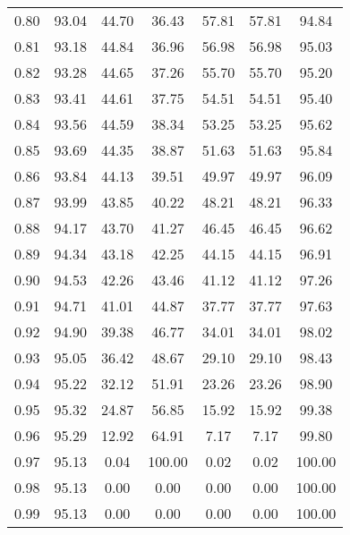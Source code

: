 \begin{tabular}{|c|c|c|c|c|c|c|}
      0.80 &     93.04 &     44.70 &      36.43 &   57.81 &      57.81 &         94.84 \\
      0.81 &     93.18 &     44.84 &      36.96 &   56.98 &      56.98 &         95.03 \\
      0.82 &     93.28 &     44.65 &      37.26 &   55.70 &      55.70 &         95.20 \\
      0.83 &     93.41 &     44.61 &      37.75 &   54.51 &      54.51 &         95.40 \\
      0.84 &     93.56 &     44.59 &      38.34 &   53.25 &      53.25 &         95.62 \\
      0.85 &     93.69 &     44.35 &      38.87 &   51.63 &      51.63 &         95.84 \\
      0.86 &     93.84 &     44.13 &      39.51 &   49.97 &      49.97 &         96.09 \\
      0.87 &     93.99 &     43.85 &      40.22 &   48.21 &      48.21 &         96.33 \\
      0.88 &     94.17 &     43.70 &      41.27 &   46.45 &      46.45 &         96.62 \\
      0.89 &     94.34 &     43.18 &      42.25 &   44.15 &      44.15 &         96.91 \\
      0.90 &     94.53 &     42.26 &      43.46 &   41.12 &      41.12 &         97.26 \\
      0.91 &     94.71 &     41.01 &      44.87 &   37.77 &      37.77 &         97.63 \\
      0.92 &     94.90 &     39.38 &      46.77 &   34.01 &      34.01 &         98.02 \\
      0.93 &     95.05 &     36.42 &      48.67 &   29.10 &      29.10 &         98.43 \\
      0.94 &     95.22 &     32.12 &      51.91 &   23.26 &      23.26 &         98.90 \\
      0.95 &     95.32 &     24.87 &      56.85 &   15.92 &      15.92 &         99.38 \\
      0.96 &     95.29 &     12.92 &      64.91 &    7.17 &       7.17 &         99.80 \\
      0.97 &     95.13 &      0.04 &     100.00 &    0.02 &       0.02 &        100.00 \\
      0.98 &     95.13 &      0.00 &       0.00 &    0.00 &       0.00 &        100.00 \\
      0.99 &     95.13 &      0.00 &       0.00 &    0.00 &       0.00 &        100.00 \\
\bottomrule
\end{tabular}
